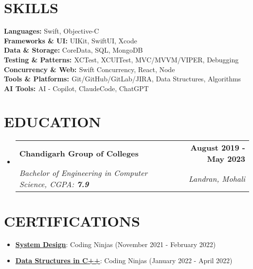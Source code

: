 \documentclass[letterpaper,11pt]{article}
\makeatletter
\newcommand{\resumeItem}[1]{
  \item\small{
    {#1 \vspace{-2pt}}
  }
}
\newcommand{\resumeSubheading}[4]{
  \vspace{-2pt}\item
    \begin{tabular*}{1.0\textwidth}[t]{l@{\extracolsep{\fill}}r}
      \textbf{\large#1} & \textbf{\small #2} \\
      \textit{\large#3} & \textit{\small #4} \\
      
    \end{tabular*}\vspace{-7pt}
}
\newcommand{\resumeSubHeadingListStart}{\begin{itemize}[leftmargin=0.0in, label={}]}
\newcommand{\resumeSubHeadingListEnd}{\end{itemize}}
\newcommand{\resumeItemListStart}{\begin{itemize}}
\newcommand{\resumeItemListEnd}{\end{itemize}\vspace{-5pt}}
\makeatother
\begin{document}
\section{SKILLS}
 \begin{itemize}[leftmargin=0.15in, label={}]
    \small{\item{
     \textbf{\normalsize{Languages:}}{ 
     \normalsize{Swift, Objective-C}} \\
     \textbf{\normalsize{Frameworks \& UI:}}{ 
     \normalsize{UIKit, SwiftUI, Xcode}} \\
     \textbf{\normalsize{Data \& Storage:}}{ \normalsize{CoreData, SQL, MongoDB}} \\
     \textbf{\normalsize{Testing \& Patterns: }}{ \normalsize{XCTest, XCUITest, MVC/MVVM/VIPER, Debugging}} \\
     \textbf{\normalsize{Concurrency \& Web: }}{\normalsize{Swift Concurrency, React, Node}} \\
     \textbf{\normalsize{Tools \& Platforms: }}{\normalsize{Git/GitHub/GitLab/JIRA, Data Structures, Algorithms}} \\
     \textbf{\normalsize{AI Tools: }}{\normalsize{AI - Copilot, ClaudeCode, ChatGPT}} \\
    }}
 \end{itemize}

\section{EDUCATION}
  \resumeSubHeadingListStart
    \resumeSubheading
      {Chandigarh Group of Colleges}{August 2019 - May 2023}
      {Bachelor of Engineering in Computer Science, CGPA: \textbf{7.9}}{Landran, Mohali}
  \resumeSubHeadingListEnd

\section{CERTIFICATIONS}
    \vspace{0pt}
    \resumeItemListStart
        \resumeItem{\normalsize{\href{http://ninjasfiles.s3.amazonaws.com/certificate18894980e4209379ac28665887f78da42bac5c2.pdf}{\textbf{System Design}}: Coding Ninjas (November 2021 - February 2022)}}
        \resumeItem{\normalsize{\href{https://ninjasfiles.s3.amazonaws.com/certificate19853580c201378561a01f48ae87f59e9220db2.pdf}{\textbf{Data Structures in C++}}: Coding Ninjas (January 2022 - April 2022)}}
    \resumeItemListEnd
\end{document}

